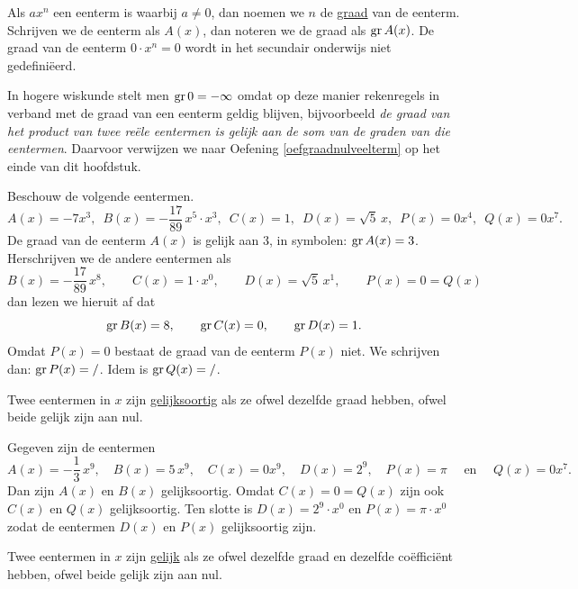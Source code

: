 \documentclass{ximera}
\begin{document}
Als $ax^n$ een eenterm is waarbij $a \neq 0$, dan noemen we $n$ de \underline{graad} van de eenterm. Schrijven we de eenterm als $A(x)$, dan noteren we de graad als $\operatorname{gr} A(x)$. De graad van de eenterm $0\cdot x^n = 0$ wordt in het secundair onderwijs niet gedefini\"eerd.

\medskip

\begin{Uitbreiding}
In hogere wiskunde stelt men $\operatorname{gr} 0 = - \infty$ omdat op deze manier rekenregels in verband met de graad van een eenterm geldig blijven, bijvoorbeeld 
{\em de graad van het product van twee re\"ele eentermen is gelijk aan de som van de graden van die eentermen}. Daarvoor verwijzen we naar Oefening \ref{oefgraadnulveelterm} op het einde van dit hoofdstuk.
\end{Uitbreiding}

\begin{example} 
Beschouw de volgende eentermen.
\[
A(x) = -7x^3, \,\,\, B(x) = -\frac{17}{89}\,x^5\cdot x^3, \,\,\, C(x) = 1, \,\,\, D(x) = \sqrt{5}\,x, \,\,\, P(x) = 0 x^4, \,\,\,  Q(x) = 0 x^7.
\]
De graad van de eenterm $A(x)$ is gelijk aan $3$, in symbolen: $\operatorname{gr} A(x) = 3$. Herschrijven we de andere eentermen als
\[
B(x) = -\frac{17}{89}\,x^8, \qquad C(x) = 1\cdot x^0, \qquad D(x) = \sqrt{5}\,x^1, \qquad P(x) = 0 = Q(x)
\]
dan lezen we hieruit af dat 
\[
\operatorname{gr} B(x) = 8, \qquad \operatorname{gr} C(x) = 0, \qquad \operatorname{gr} D(x) = 1. 
\]
Omdat $P(x) = 0$ bestaat de graad van de eenterm $P(x)$ niet. We schrijven dan: $\operatorname{gr} P(x) = /$. Idem is $\operatorname{gr} Q(x) = /$.
\end{example} 

Twee eentermen in $x$ zijn \underline{gelijksoortig} als ze ofwel dezelfde graad hebben, ofwel beide gelijk zijn aan nul.

\begin{example} 
Gegeven zijn de eentermen
\[
A(x) = -\frac{1}{3}\,x^9, \quad B(x) = 5\,x^9, \quad C(x) = 0x^9, \quad D(x) = 2^9, \quad P(x) = \pi \quad \text{ en } \quad Q(x) = 0 x^7.
\]
Dan zijn $A(x)$ en $B(x)$ gelijksoortig. Omdat $C(x) = 0 = Q(x)$ zijn ook $C(x)$ en $Q(x)$ gelijksoortig. Ten slotte is $D(x) = 2^9 \cdot x^0$ en $P(x) = \pi \cdot x^0$ zodat de eentermen $D(x)$ en $P(x)$ gelijksoortig zijn.  
\end{example} 

Twee eentermen in $x$ zijn \underline{gelijk} als ze ofwel dezelfde graad en dezelfde co\"effici\"ent hebben, ofwel beide gelijk zijn aan nul.
\end{document}
